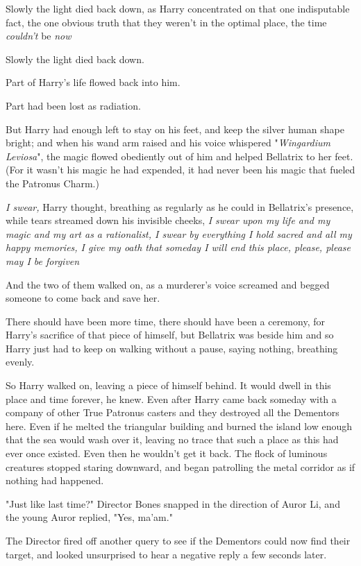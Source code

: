 Slowly the light died back down, as Harry concentrated on that one indisputable
fact, the one obvious truth that they weren't in the optimal place, the time
\emph{couldn't} be \emph{now{\el}}

Slowly the light died back down.

Part of Harry's life flowed back into him.

Part had been lost as radiation.

But Harry had enough left to stay on his feet, and keep the silver human shape
bright; and when his wand arm raised and his voice whispered "\emph{Wingardium
Leviosa}", the magic flowed obediently out of him and helped Bellatrix to her
feet. (For it wasn't his magic he had expended, it had never been his magic
that fueled the Patronus Charm.)

\emph{I swear,} Harry thought, breathing as regularly as he could in
Bellatrix's presence, while tears streamed down his invisible cheeks, \emph{I
swear upon my life and my magic and my art as a rationalist, I swear by
everything I hold sacred and all my happy memories, I give my oath that someday
I will end this place, please, please may I be forgiven{\el}}

And the two of them walked on, as a murderer's voice screamed and begged
someone to come back and save her.

There should have been more time, there should have been a ceremony, for
Harry's sacrifice of that piece of himself, but Bellatrix was beside him and so
Harry just had to keep on walking without a pause, saying nothing, breathing
evenly.

So Harry walked on, leaving a piece of himself behind. It would dwell in this
place and time forever, he knew. Even after Harry came back someday with a
company of other True Patronus casters and they destroyed all the Dementors
here. Even if he melted the triangular building and burned the island low
enough that the sea would wash over it, leaving no trace that such a place as
this had ever once existed. Even then he wouldn't get it back.
\sbreak
The flock of luminous creatures stopped staring downward, and began patrolling
the metal corridor as if nothing had happened.

"Just like last time?" Director Bones snapped in the direction of Auror Li, and
the young Auror replied, "Yes, ma'am."

The Director fired off another query to see if the Dementors could now find
their target, and looked unsurprised to hear a negative reply a few seconds
later.

